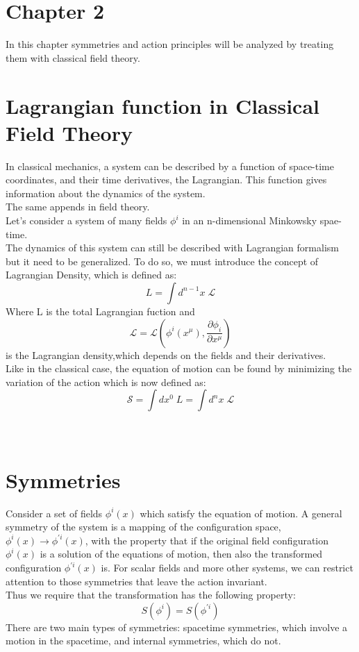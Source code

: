 \documentclass[a4paper,10pt]{article}
\date{11/4/2019}
\begin{document}
 \section*{Chapter 2}
 In this chapter symmetries and action principles will be analyzed by treating them with classical field theory.
 \section*{Lagrangian function in Classical Field Theory}
 In classical mechanics, a system can be described by a function of space-time coordinates, and their time derivatives, the Lagrangian.
 This function gives information about the dynamics of the system.\\
 The same appends in field theory.\\
 Let's consider a system of many fields $\phi^i$ in an n-dimensional Minkowsky spae-time.\\
 The dynamics of this system can still be described with Lagrangian formalism but it need to be generalized.
 To do so, we must introduce the concept of Lagrangian Density, which is defined as:
 \begin{equation}
  L=\int{d^{n-1}x\;\mathcal{L} }
 \end{equation}
 Where L is the total Lagrangian fuction and 
 \begin{equation}
  \mathcal{L}= \mathcal{L} \left(\phi^i(x^\mu),\frac{\partial\phi_i}{\partial x^\mu} \right)
 \end{equation}
 is the Lagrangian density,which depends on the fields and their derivatives.\\
 Like in the classical case, the equation of motion can be found by minimizing the variation of the action which is now defined as:
 \begin{equation}
  \mathcal{S}=\int{dx^0\;L } = \int{d^nx\;\mathcal{L} }
 \end{equation}
 \\
 \\
 \section*{Symmetries}
 Consider a set of fields $\phi^i(x)$ which satisfy the equation of motion.
 A general symmetry of the system is a mapping of the configuration space, $\phi^i(x)\rightarrow\phi^{'i}(x)$,
 with the property that if the original field configuration $\phi^i(x)$ is a solution of the equations
 of motion, then also the transformed configuration $\phi^{'i}(x)$ is. 
 For scalar fields and more other systems, we can restrict attention to those symmetries that leave the action invariant.\\
 Thus we require that the transformation has the following property:
 \begin{equation}
  S(\phi^i)=S(\phi^{'i})
 \end{equation}
 There are two main types of symmetries: spacetime symmetries, which involve a motion in the spacetime, and internal symmetries, which do not.
\end{document}
